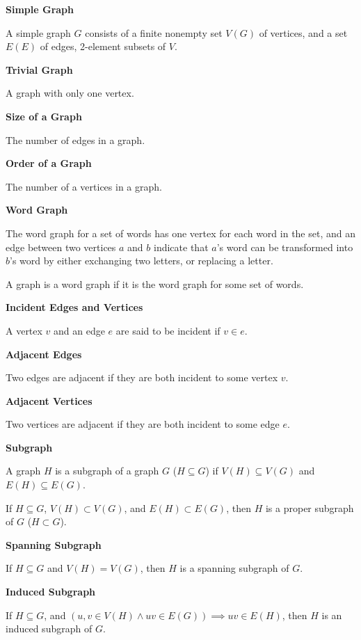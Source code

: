 \documentclass{article}
\begin{document}
\pagecolor{black}
\color{white}

\noindent\textbf{Simple Graph}

    A simple graph $G$ consists of a finite nonempty set $V(G)$ of vertices, and a set $E(E)$ of edges, 2-element subsets of $V$.

\medskip\noindent\textbf{Trivial Graph}

    A graph with only one vertex.

\medskip\noindent\textbf{Size of a Graph}

    The number of edges in a graph.

\medskip\noindent\textbf{Order of a Graph}

    The number of a vertices in a graph.

\medskip\noindent\textbf{Word Graph}

    The word graph for a set of words has one vertex for each word in the set, and an edge between two vertices $a$ and $b$ indicate that $a$'s word can be transformed into $b$'s word by either exchanging two letters, or replacing a letter.

    A graph is a word graph if it is the word graph for some set of words.

\medskip\noindent\textbf{Incident Edges and Vertices}

    A vertex $v$ and an edge $e$ are said to be incident if $v \in e$.

\medskip\noindent\textbf{Adjacent Edges}

    Two edges are adjacent if they are both incident to some vertex $v$.

\medskip\noindent\textbf{Adjacent Vertices}

    Two vertices are adjacent if they are both incident to some edge $e$.

\medskip\noindent\textbf{Subgraph}

    A graph $H$ is a subgraph of a graph $G$ ($H \subseteq G$) if $V(H) \subseteq V(G)$ and $E(H) \subseteq E(G)$.

    If $H \subseteq G$, $V(H) \subset V(G)$, and $E(H) \subset E(G)$, then $H$ is a proper subgraph of $G$ ($H \subset G$).

\medskip\noindent\textbf{Spanning Subgraph}

    If $H \subseteq G$ and $V(H) = V(G)$, then $H$ is a spanning subgraph of $G$.

\medskip\noindent\textbf{Induced Subgraph}

    If $H \subseteq G$, and $(u,v \in V(H) \wedge uv \in E(G)) \implies uv \in E(H)$, then $H$ is an induced subgraph of $G$.
\end{document}

